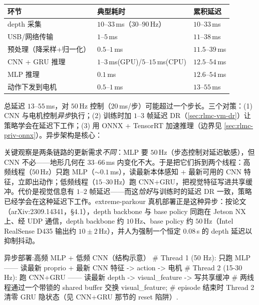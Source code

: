 \begin{center}
\small
\begin{tabular}{@{}lll@{}}
\toprule
环节 & 典型耗时 & 累积延迟 \\
\midrule
depth 采集 & $10$--$33$\,ms（$30$--$90$\,Hz） & $10$--$33$\,ms \\
USB/网络传输 & $1$--$5$\,ms & $11$--$38$\,ms \\
预处理（降采样+归一化） & $0.5$--$1$\,ms & $11.5$--$39$\,ms \\
CNN + GRU 推理 & $1$--$3$\,ms(GPU)/$5$--$15$\,ms(CPU) & $12.5$--$54$\,ms \\
MLP 推理 & $0.1$\,ms & $12.6$--$54$\,ms \\
动作下发到电机 & $0.5$--$1$\,ms & $13$--$55$\,ms \\
\bottomrule
\end{tabular}
\end{center}

总延迟 $13$--$55$\,ms，对 $50$\,Hz 控制（$20$\,ms/步）可能超过一个步长。三个对策：(1) CNN 与电机控制\emph{异步}执行；(2) 训练时加 $1$--$3$ 帧延迟 DR（\cref{sec:rlmc-vm-dr}）让策略学会在延迟下工作；(3) 用 ONNX + TensorRT 加速推理（边界见 \cref{sec:rlmc-priv-onnx}）。异步架构是核心：

\begin{insight}\label{ins:rlmc-vm-async}
关键观察是两条链路的更新需求\emph{不同}：MLP 要 $50$\,Hz（步态控制对延迟敏感），但 CNN 不必——地形几何在 $33$--$66$\,ms 内变化不大。于是把它们拆到两个线程：高频线程（$50$\,Hz）只跑 MLP（$\sim 0.1$\,ms），读最新本体感知 + 最新可用的 CNN 特征，立即出动作；低频线程（$15$--$30$\,Hz）跑 CNN+GRU，把视觉特征写进共享缓冲。代价是视觉信息有 $1$--$2$ 帧延迟——而这\emph{恰好}与训练时的延迟 DR 一致，策略已经学会在这种延迟下工作。extreme-parkour 真机部署正是这种异步：按论文（arXiv:2309.14341，\S4.1），depth backbone 与 base policy 同跑在 Jetson NX 上、经 UDP 通信，depth backbone 约 $10$\,Hz、base policy 约 $50$\,Hz（Intel RealSense D435 输出约 $10\pm 2$\,Hz），并人为强制一个恒定 $0.08$\,s 的 depth 延迟以抑制抖动。
\end{insight}

\begin{codebox}[Python]{异步部署:高频 MLP + 低频 CNN（结构示意）}
# Thread 1 (50 Hz): 只跑 MLP —— 读最新 proprio + 最新 CNN 特征 -> action -> 电机
# Thread 2 (15-30 Hz): 跑 CNN+GRU —— 读最新 depth -> visual_feature -> 写共享缓冲
# 两线程通过一个带锁的 shared buffer 交换 visual_feature;
# episode 结束时 Thread 2 清零 GRU 隐状态（见 CNN+GRU 那节的 reset 陷阱）.
\end{codebox}

